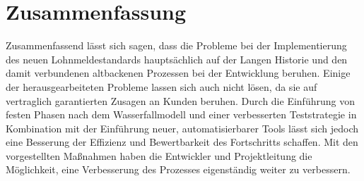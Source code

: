 \chapter{Zusammenfassung}

Zusammenfassend lässt sich sagen, dass die Probleme bei der Implementierung des neuen Lohnmeldestandards hauptsächlich auf der Langen Historie und den damit verbundenen altbackenen Prozessen bei der Entwicklung beruhen. 
Einige der herausgearbeiteten Probleme lassen sich auch nicht lösen, da sie auf vertraglich garantierten Zusagen an Kunden beruhen.
Durch die Einführung von festen Phasen nach dem Wasserfallmodell und einer verbesserten Teststrategie in Kombination mit der Einführung neuer, automatisierbarer Tools lässt sich jedoch eine Besserung der Effizienz und Bewertbarkeit des Fortschritts schaffen.
Mit den vorgestellten Maßnahmen haben die Entwickler und Projektleitung die Möglichkeit, eine Verbesserung des Prozesses eigenständig weiter zu verbessern.